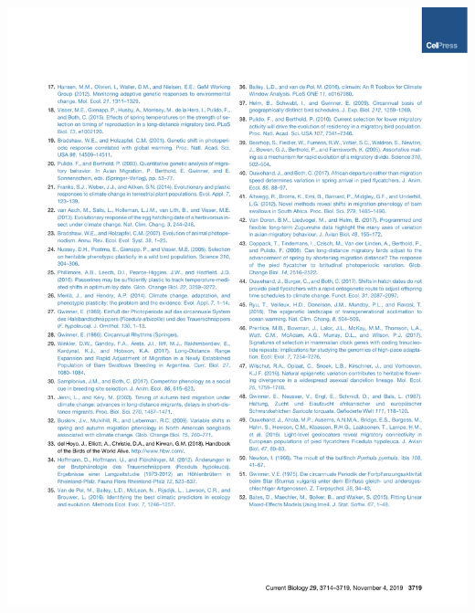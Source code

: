 \documentclass[a4paper, twoside]{templates/ociamthesis}
\begin{document}
\begin{center}\includegraphics[width=1\linewidth]{pdf_chapters/pied/pied_crop_Part06} \end{center}
\end{document}
